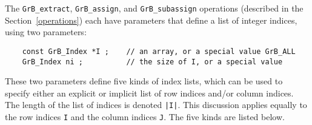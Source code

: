 \documentclass[12pt]{article}
\begin{document}
The \verb'GrB_extract', \verb'GrB_assign', and \verb'GrB_subassign' operations
(described in the Section~\ref{operations}) each have parameters that define a
list of integer indices, using two parameters:

    {\footnotesize
    \begin{verbatim}
    const GrB_Index *I ;    // an array, or a special value GrB_ALL
    GrB_Index ni ;          // the size of I, or a special value \end{verbatim}}

These two parameters define five kinds of index lists, which can be used to
specify either an explicit or implicit list of row indices and/or column
indices.  The length of the list of indices is denoted \verb'|I|'.  This
discussion applies equally to the row indices \verb'I' and the column indices
\verb'J'.  The five kinds are listed below.
\end{document}
